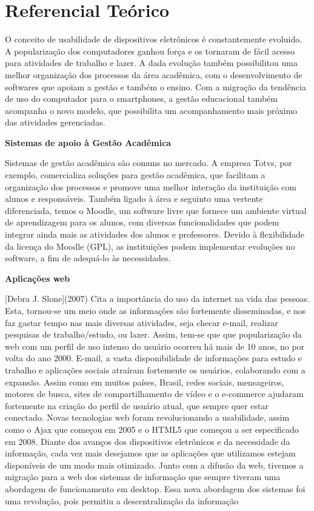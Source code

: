\chapter{Referencial Teórico}

O conceito de usabilidade de dispositivos eletrônicos é constantemente evoluido. A popularização dos computadores ganhou força e os tornaram de fácil acesso para atividades de trabalho e lazer. A dada evolução também possibilitou uma melhor organização dos processos da área acadêmica, com o desenvolvimento de softwares que apoiam a gestão e também o ensino. 
Com a migração da tendência de uso do computador para o smartphones, a gestão educacional também acompanha o novo modelo, que possibilita um acompanhamento mais próximo das atividades gerenciadas. 

\textbf{Sistemas de apoio à Gestão Acadêmica}

Sistemas de gestão acadêmica são comuns no mercado. A empresa Totvs, por exemplo, comercializa soluções para gestão acadêmica, que facilitam a organização dos processos e promove uma melhor interação da instituição com alunos e responsáveis. 
Também ligado à área e seguinto uma vertente diferenciada, temos o Moodle, um software livre que fornece um ambiente virtual de aprendizagem para os alunos, com diversas funcionalidades que podem integrar ainda mais as atividades dos alunos e professores. Devido à flexibilidade da licença do Moodle (GPL), as instituições podem implementar evoluções no software, a fim de adequá-lo às necessidades.

\textbf{Aplicações web}

[Debra J. Slone](2007) Cita a importância do uso da internet na vida das pessoas. Esta, tornou-se um meio onde as informações são fortemente disseminadas, e nos faz gastar tempo nas mais diversas atividades, seja checar e-mail, realizar pesquisas de trabalho/estudo, ou lazer. Assim, tem-se que que popularização da web com um perfil de uso intenso do usuário ocorreu há mais de 10 anos, no por volta do ano 2000. E-mail, a vasta disponibilidade de informações para estudo e trabalho e aplicações sociais atraíram fortemente os usuários, colaborando com a expansão. 
Assim como em muitos países, Brasil, redes sociais, mensageiros, motores de busca, sites de compartilhamento de vídeo e o e-commerce ajudaram fortemente na criação do perfil de usuário atual, que sempre quer estar conectado. 
Novas tecnologias web foram revolucionando a usabilidade, assim como o Ajax que começou em 2005 e o HTML5 que começou a ser especificado em 2008. Diante dos avanços dos dispositivos eletrônicos e da necessidade da informação, cada vez mais desejamos que as aplicações que utilizamos estejam disponíveis de um modo mais otimizado. Junto com a difusão da web, tivemos a migração para a web dos sistemas de informação que sempre tiveram uma abordagem de funcionamento em desktop. Essa nova abordagem dos sistemas foi uma revolução, pois permitiu a descentralização da informação

